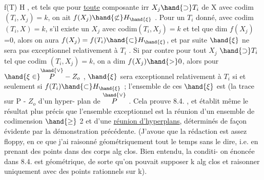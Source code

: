  f(T) \hand{$\subset$} H , et tels que pour \uline{toute} composante irr $X_j \hand{\supset} T_i$ de X
avec codim $(T_i,X_j)=k$, on ait $f(X_j)\hand{\not\subset} H_{\hand{\xi}}$ . Pour un $T_i$ donné,
 avec codim$(T_i,X)=k$, s'il existe un $X_j$ avec codim$(T_i,X_j)=k$
et tel que dim $f(X_j)$ =0, alors 
 on aura $f(X_j) = f(T_i) \hand{\subset} H_{\hand{\xi}}$, et par suite $\hand{\xi}$ ne
sera pas exceptionnel relativement à $T_i$ . Si par contre pour tout $X_j$
$\hand{\supset} T_i$ tel que codim $(T_i,X_j) = k$, on a dim $f(X_j) \hand{>} 0$, alors pour
$\hand{\xi \in} \overset{\hand{\vee}}{P} - Z_o$ , $\hand{\xi}$ sera exceptionnel relativement à $T_i$ si et seulement si
$f(T_i) \hand{\subset} H_{\hand{\xi}}$ ; l'ensemble de ces $\hand{\xi}$ est (la trace sur P - $Z_o$\deleted{)} d'\hand{)}un hyper-
plan de $\overset{\hand{\vee}}{P}$ . Cela prouve 8.4. , et établit même le résultat plus précis
que l'ensemble exceptionnel est la réunion d'un ensemble de codimension
$\hand{\geq}$ 2 et d'une \uline{réunion d'hyperplans}, déterminés de façon évidente par la
démonstration précédente. (J'avoue que la rédaction est assez floppy, \margin{\hand{|}}
en ce que j'ai raisonné géométriquement tout le temps sans le dire, i.e.
en prenant des points dans des corps alg clos. Bien entendu, la conditi-
on énoncée dans 8.4. est  géométrique, de sorte qu'on pouvait supposer
k alg clos et raisonner uniquement avec des points rationnels sur k).

 

